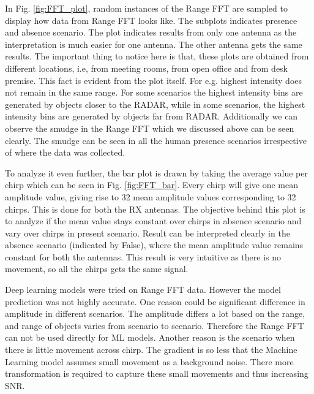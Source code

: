 In Fig. \ref{fig:FFT_plot}, random instances of the Range FFT are sampled to display how data from Range FFT looks like. The subplots indicates presence and absence scenario. The plot indicates results from only one antenna as the interpretation is much easier for one antenna. The other antenna gets the same results. The important thing to notice here is that, these plots are obtained from different locations, i.e, from meeting rooms, from open office and from desk premise. This fact is evident from the plot itself. For e.g. highest intensity does not remain in the same range. For some scenarios the highest intensity bins are generated by objects closer to the RADAR, while in some scenarios, the highest intensity bins are generated by objects far from RADAR. Additionally we can observe the smudge in the Range FFT which we discussed above can be seen clearly. The smudge can be seen in all the human presence scenarios irrespective of where the data was collected. 

To analyze it even further, the bar plot is drawn by taking the average value per chirp which can be seen in Fig. \ref{fig:FFT_bar}. Every chirp will give one mean amplitude value, giving rise to 32 mean amplitude values corresponding to 32 chirps. This is done for both the RX antennas. The objective behind this plot is to analyze if the mean value stays constant over chirps in absence scenario and vary over chirps in present scenario. Result can be interpreted clearly in the absence scenario (indicated by False), where the mean amplitude value remains constant for both the antennas. This result is very intuitive as there is no movement, so all the chirps gets the same signal.

Deep learning models were tried on Range FFT data. However the model prediction was not highly accurate. One reason could be significant difference in amplitude in different scenarios. The amplitude differs a lot based on the range, and range of objects varies from scenario to scenario. Therefore the Range FFT can not be used directly for ML models. Another reason is the scenario when there is little movement across chirp. The gradient is so less that the Machine Learning model assumes small movement as a background noise. There more transformation is required to capture these small movements and thus increasing SNR.

